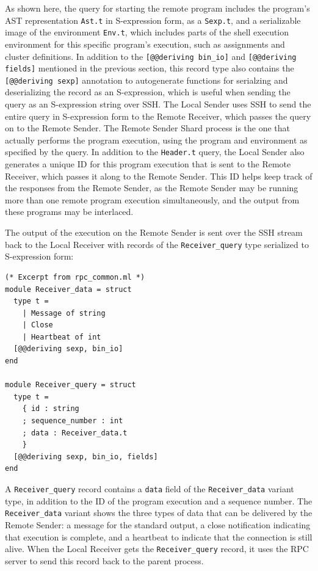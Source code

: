 \documentclass[twoside]{report}
\begin{document}
As shown here, the query for starting the remote program includes the program's AST representation \texttt{Ast.t} in S-expression form, as a \texttt{Sexp.t}, and a serializable image of the environment \texttt{Env.t}, which includes parts of the shell execution environment for this specific program's execution, such as assignments and cluster definitions.
In addition to the \texttt{[@@deriving bin\_io]} and \texttt{[@@deriving fields]} mentioned in the previous section, this record type also contains the \texttt{[@@deriving sexp]} annotation to autogenerate functions for serialzing and deserializing the record as an S-expression, which is useful when sending the query as an S-expression string over SSH.
The Local Sender uses SSH to send the entire query in S-expression form to the Remote Receiver, which passes the query on to the Remote Sender.
The Remote Sender Shard process is the one that actually performs the program execution, using the program and environment as specified by the query.
In addition to the \texttt{Header.t} query, the Local Sender also generates a unique ID for this program execution that is sent to the Remote Receiver, which passes it along to the Remote Sender.
This ID helps keep track of the responses from the Remote Sender, as the Remote Sender may be running more than one remote program execution simultaneously, and the output from these programs may be interlaced.

The output of the execution on the Remote Sender is sent over the SSH stream back to the Local Receiver with records of the \texttt{Receiver\_query} type serialized to S-expression form:

\begin{minipage}[c]{\textwidth-15pt}
  \begin{lstlisting}
(* Excerpt from rpc_common.ml *)
module Receiver_data = struct
  type t =
    | Message of string
    | Close
    | Heartbeat of int
  [@@deriving sexp, bin_io]
end

module Receiver_query = struct
  type t =
    { id : string
    ; sequence_number : int
    ; data : Receiver_data.t
    }
  [@@deriving sexp, bin_io, fields]
end
\end{lstlisting}
  \smallskip
\end{minipage}

A \texttt{Receiver\_query} record contains a \texttt{data} field of the \texttt{Receiver\_data} variant type, in addition to the ID of the program execution and a sequence number.
The \texttt{Receiver\_data} variant shows the three types of data that can be delivered by the Remote Sender: a message for the standard output, a close notification indicating that execution is complete, and a heartbeat to indicate that the connection is still alive.
When the Local Receiver gets the \texttt{Receiver\_query} record, it uses the RPC server to send this record back to the parent process.
\end{document}
